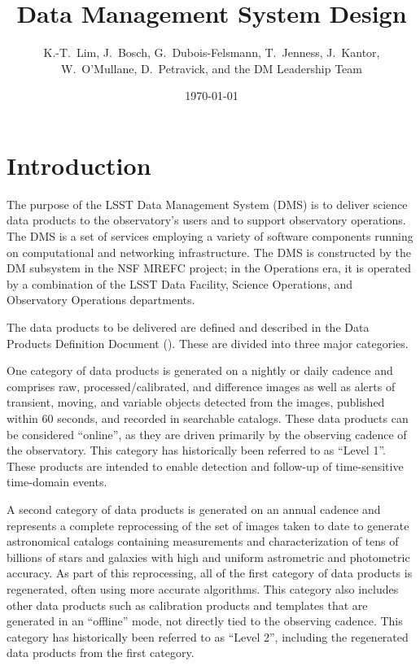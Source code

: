 \documentclass[DM,lsstdraft,toc]{lsstdoc}
\title{Data Management System Design}
\author{
  K.-T.~Lim,
  J.~Bosch,
  G.~Dubois-Felsmann,
  T.~Jenness,
  J.~Kantor,
  W.~O'Mullane,
  D.~Petravick,
  and
  the DM Leadership Team}
\date{\today}
\begin{document}
\maketitle

\section{Introduction}\label{introduction}

The purpose of the LSST Data Management System (DMS) is to deliver science data
products to the observatory's users and to support observatory operations.  The
DMS is a set of services employing a variety of software components running on
computational and networking infrastructure.  The DMS is constructed by the DM
subsystem in the NSF MREFC project; in the Operations era, it is operated by a
combination of the LSST Data Facility, Science Operations, and Observatory
Operations departments.

The data products to be delivered are defined and described in the Data
Products Definition Document (). These are divided into three
major categories.

One category of data products is generated on a nightly or daily cadence
and comprises raw, processed/calibrated, and difference images as well as alerts
of transient, moving, and variable objects detected from the images,
published within 60 seconds, and recorded in searchable catalogs. These
data products can be considered ``online'', as they are driven primarily
by the observing cadence of the observatory. This category has
historically been referred to as ``Level 1''.  These products are intended to
enable detection and follow-up of time-sensitive time-domain events.

A second category of data products is generated on an annual cadence and
represents a complete reprocessing of the set of images taken to date to
generate astronomical catalogs containing measurements and
characterization of tens of billions of stars and galaxies with high and
uniform astrometric and photometric accuracy. As part of this
reprocessing, all of the first category of data products is regenerated,
often using more accurate algorithms. This category also includes other
data products such as calibration products and templates that are
generated in an ``offline'' mode, not directly tied to the observing
cadence. This category has historically been referred to as ``Level 2'',
including the regenerated data products from the first category.
\end{document}
